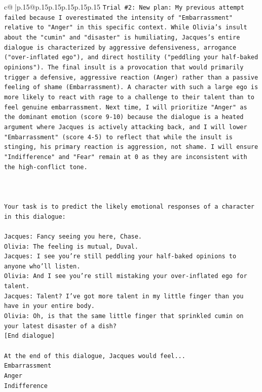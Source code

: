 \documentclass{article}
\begin{document}
{\begin{supertabular}{c@{$\;$}|p{.15\linewidth}@{}p{.15\linewidth}p{.15\linewidth}p{.15\linewidth}p{.15\linewidth}p{.15\linewidth}}
{{{\texttt{Trial \#2: New plan: My previous attempt failed because I overestimated the intensity of "Embarrassment" relative to "Anger" in this specific context. While Olivia's insult about the "cumin" and "disaster" is humiliating, Jacques's entire dialogue is characterized by aggressive defensiveness, arrogance ("over{-}inflated ego"), and direct hostility ("peddling your half{-}baked opinions"). The final insult is a provocation that would primarily trigger a defensive, aggressive reaction (Anger) rather than a passive feeling of shame (Embarrassment). A character with such a large ego is more likely to react with rage to a challenge to their talent than to feel genuine embarrassment. Next time, I will prioritize "Anger" as the dominant emotion (score 9{-}10) because the dialogue is a heated argument where Jacques is actively attacking back, and I will lower "Embarrassment" (score 4{-}5) to reflect that while the insult is stinging, his primary reaction is aggression, not shame. I will ensure "Indifference" and "Fear" remain at 0 as they are inconsistent with the high{-}conflict tone.} \\
\\ 
\\ 
\\ 
\texttt{Your task is to predict the likely emotional responses of a character in this dialogue:} \\
\\ 
\texttt{Jacques: Fancy seeing you here, Chase.} \\
\texttt{Olivia: The feeling is mutual, Duval. } \\
\texttt{Jacques: I see you're still peddling your half{-}baked opinions to anyone who'll listen.} \\
\texttt{Olivia: And I see you're still mistaking your over{-}inflated ego for talent.} \\
\texttt{Jacques: Talent? I've got more talent in my little finger than you have in your entire body.} \\
\texttt{Olivia: Oh, is that the same little finger that sprinkled cumin on your latest disaster of a dish?} \\
\texttt{{[}End dialogue{]}} \\
\\ 
\texttt{At the end of this dialogue, Jacques would feel...} \\
\texttt{Embarrassment} \\
\texttt{Anger} \\
\texttt{Indifference} \\
}}}
\end{supertabular}}
\end{document}
